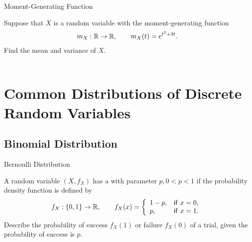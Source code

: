 \begin{frame}{Moment-Generating Function}

\justifying
{} Suppose that $X$ is a random variable with the moment-generating function 
\begin{align*}
m_X: \mathbb{R}\rightarrow \mathbb{R}, \qquad m_X(t) = e^{t^2 + 3t}.
\end{align*}
Find the mean and variance of $X$.\\
~\\

\end{frame}


\section{Common Distributions of Discrete Random Variables}

\subsection{Binomial Distribution}

\begin{frame}{Bernoulli Distribution}

\justifying
{} A random variable $(X, f_X)$ has a  with parameter $p, 0 < p < 1$ if the probability density function is defined by
\begin{align*}
f_X: \{0, 1\} \rightarrow \mathbb{R}, \qquad f_X(x) = \left\{
\begin{array}{ll}
1-p, & \mathsf{if\ } x = 0, \\
p, & \mathsf{if\ } x = 1.
\end{array}
\right.
\end{align*}
 Describe the probability of success $f_X(1)$ or failure $f_X(0)$ of a trial, given the probability of success is $p$.

\end{frame}

